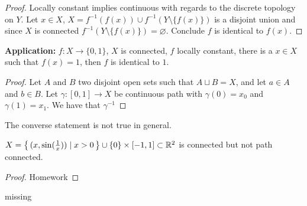 \begin{proof}
    Locally constant implies continuous with regards to the discrete topology on \(Y\). Let \(x \in X\), \(X = f^{-1}(f(x)) \cup f^{-1}(Y \setminus \{f(x)\})\) is a disjoint union and since \(X\) is connected \(f^{-1}(Y \setminus \{f(x)\}) = \varnothing\). Conclude \(f\) is identical to \(f(x)\).
\end{proof}

\textbf{Application:} \(f: X \longrightarrow \{0, 1\}\), \(X\) is connected, \(f\) locally constant, there is a \(x \in X\) such that \(f(x) = 1\), then \(f\) is identical to \(1\).

\begin{proof}
    Let \(A\) and \(B\) two disjoint open sets such that \(A \sqcup B = X\), and let \(a \in A\) and \(b \in B\). Let \(\gamma: [0, 1] \longrightarrow X\) be continuous path with \(\gamma(0) = x_0\) and \(\gamma(1) = x_1\). We have that \(\gamma^{-1}\)
\end{proof}

\begin{remark}
    The converse statement is not true in general.
\end{remark}

\begin{example}
    \(X = \left\{\, (x, \sin(\frac{1}{x})) \mid x > 0 \,\right\} \cup \{0\} \times [-1, 1] \subset \mathbb{R}^2\) is connected but not path connected.
\end{example}
\begin{proof}
    Homework
\end{proof}
\begin{remark}
    missing
\end{remark}
\newpage

